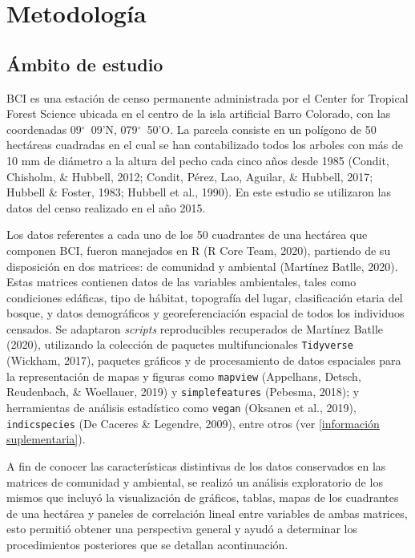\documentclass[11pt,]{article}
\begin{document}
\section{Metodología}\label{metodologuxeda}

\subsection{Ámbito de estudio}\label{uxe1mbito-de-estudio}

BCI es una estación de censo permanente administrada por el Center for
Tropical Forest Science ubicada en el centro de la isla artificial Barro
Colorado, con las coordenadas 09\(^\circ\)~09'N, 079\(^\circ\)~50'O. La
parcela consiste en un polígono de 50 hectáreas cuadradas en el cual se
han contabilizado todos los arboles con más de 10 mm de diámetro a la
altura del pecho cada cinco años desde 1985 (Condit, Chisholm, \&
Hubbell, 2012; Condit, Pérez, Lao, Aguilar, \& Hubbell, 2017; Hubbell \&
Foster, 1983; Hubbell et al., 1990). En este estudio se utilizaron las
datos del censo realizado en el año 2015.

Los datos referentes a cada uno de los 50 cuadrantes de una hectárea que
componen BCI, fueron manejados en R (R Core Team, 2020), partiendo de su
disposición en dos matrices: de comunidad y ambiental (Martínez Batlle,
2020). Estas matrices contienen datos de las variables ambientales,
tales como condiciones edáficas, tipo de hábitat, topografía del lugar,
clasificación etaria del bosque, y datos demográficos y
georeferenciación espacial de todos los individuos censados. Se
adaptaron \emph{scripts} reproducibles recuperados de Martínez Batlle
(2020), utilizando la colección de paquetes multifuncionales
\texttt{Tidyverse} (Wickham, 2017), paquetes gráficos y de procesamiento
de datos espaciales para la representación de mapas y figuras como
\texttt{mapview} (Appelhans, Detsch, Reudenbach, \& Woellauer, 2019) y
\texttt{simplefeatures} (Pebesma, 2018); y herramientas de análisis
estadístico como \texttt{vegan} (Oksanen et al., 2019),
\texttt{indicspecies} (De Caceres \& Legendre, 2009), entre otros (ver
\ref{información suplementaria}).

A fin de conocer las características distintivas de los datos
conservados en las matrices de comunidad y ambiental, se realizó un
análisis exploratorio de los mismos que incluyó la visualización de
gráficos, tablas, mapas de los cuadrantes de una hectárea y paneles de
correlación lineal entre variables de ambas matrices, esto permitió
obtener una perspectiva general y ayudó a determinar los procedimientos
posteriores que se detallan acontinuación.
\end{document}
